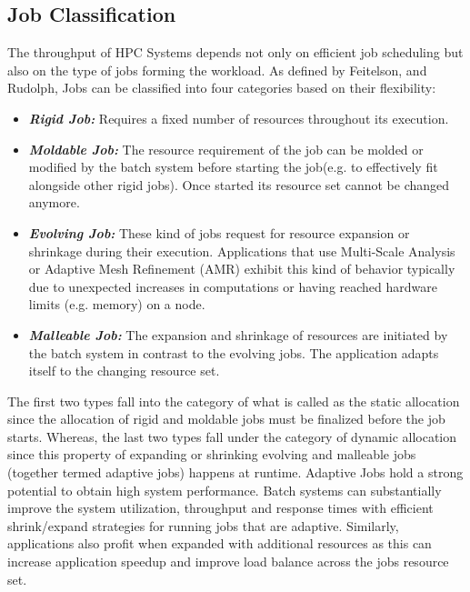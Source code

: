 \subsection{Job Classification}
The throughput of HPC Systems depends not only on efficient job scheduling but also on the type of jobs forming the workload. As defined by Feitelson, and Rudolph, Jobs can be classified into four categories based on their flexibility:
\begin{itemize}
\item \textbf{\textit{Rigid Job:}} Requires a fixed number of resources throughout its execution.
\item \textbf{\textit{Moldable Job: }} The resource requirement of the job can be molded or modified by the batch system before starting the job(e.g. to effectively fit alongside other rigid jobs). Once started its resource set cannot be changed anymore.
\item \textbf{\textit{Evolving Job: }} These kind of jobs request for resource expansion or shrinkage during their execution. Applications that use Multi-Scale Analysis or Adaptive Mesh Refinement (AMR) exhibit this kind of behavior typically due to unexpected increases in computations or having reached hardware limits (e.g. memory) on a node.
\item \textbf{\textit{Malleable Job: }} The expansion and shrinkage of resources are initiated by the batch system in contrast to the evolving jobs. The application adapts itself to the changing resource set.
\end{itemize}
The first two types fall into the category of what is called as the static allocation since the allocation of rigid and moldable jobs must be finalized before the job starts. Whereas, the last two types fall under the category of dynamic allocation since this property of expanding or shrinking evolving and malleable jobs (together termed adaptive jobs) happens at runtime. Adaptive Jobs hold a strong potential to obtain high system performance. Batch systems can substantially improve the system utilization, throughput and response times with efficient shrink/expand strategies for running jobs that are adaptive. Similarly, applications also profit when expanded with additional resources as this can increase application speedup and improve load balance across the job\textquotesingle s resource set.
